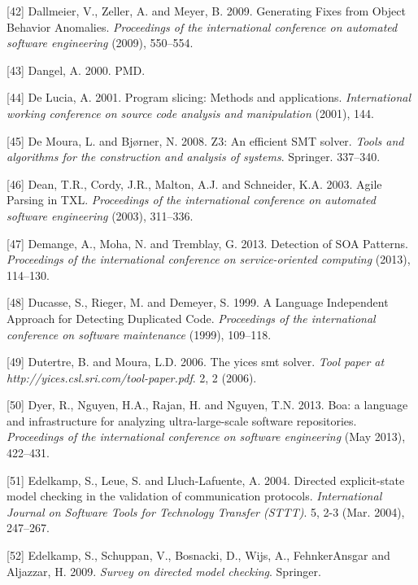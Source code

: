 \documentclass[12pt]{report}
\begin{document}
\hypertarget{ref-Dallmeier}{}
{[}42{]} Dallmeier, V., Zeller, A. and Meyer, B. 2009. Generating Fixes
from Object Behavior Anomalies. \emph{Proceedings of the international
conference on automated software engineering} (2009), 550--554.

\hypertarget{ref-Dangel2000}{}
{[}43{]} Dangel, A. 2000. PMD.

\hypertarget{ref-de2001program}{}
{[}44{]} De Lucia, A. 2001. Program slicing: Methods and applications.
\emph{International working conference on source code analysis and
manipulation} (2001), 144.

\hypertarget{ref-de2008z3}{}
{[}45{]} De Moura, L. and Bjørner, N. 2008. Z3: An efficient SMT solver.
\emph{Tools and algorithms for the construction and analysis of
systems}. Springer. 337--340.

\hypertarget{ref-Dean}{}
{[}46{]} Dean, T.R., Cordy, J.R., Malton, A.J. and Schneider, K.A. 2003.
Agile Parsing in TXL. \emph{Proceedings of the international conference
on automated software engineering} (2003), 311--336.

\hypertarget{ref-demange2013}{}
{[}47{]} Demange, A., Moha, N. and Tremblay, G. 2013. Detection of SOA
Patterns. \emph{Proceedings of the international conference on
service-oriented computing} (2013), 114--130.

\hypertarget{ref-StephaneDucasse}{}
{[}48{]} Ducasse, S., Rieger, M. and Demeyer, S. 1999. A Language
Independent Approach for Detecting Duplicated Code. \emph{Proceedings of
the international conference on software maintenance} (1999), 109--118.

\hypertarget{ref-Dutertre2006}{}
{[}49{]} Dutertre, B. and Moura, L.D. 2006. The yices smt solver.
\emph{Tool paper at http://yices.csl.sri.com/tool-paper.pdf}. 2, 2
(2006).

\hypertarget{ref-Dyer2013}{}
{[}50{]} Dyer, R., Nguyen, H.A., Rajan, H. and Nguyen, T.N. 2013. Boa: a
language and infrastructure for analyzing ultra-large-scale software
repositories. \emph{Proceedings of the international conference on
software engineering} (May 2013), 422--431.

\hypertarget{ref-Edelkamp2004}{}
{[}51{]} Edelkamp, S., Leue, S. and Lluch-Lafuente, A. 2004. Directed
explicit-state model checking in the validation of communication
protocols. \emph{International Journal on Software Tools for Technology
Transfer (STTT)}. 5, 2-3 (Mar. 2004), 247--267.

\hypertarget{ref-Edelkamp2009}{}
{[}52{]} Edelkamp, S., Schuppan, V., Bosnacki, D., Wijs, A.,
FehnkerAnsgar and Aljazzar, H. 2009. \emph{Survey on directed model
checking}. Springer.
\end{document}
